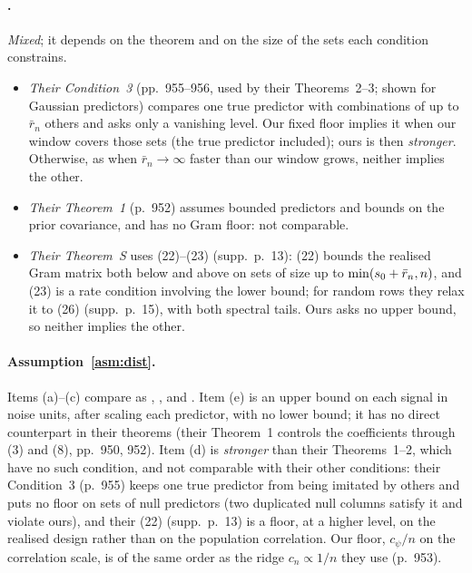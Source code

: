 \paragraph{.} \emph{Mixed}; it depends on the theorem and on the size of the sets each condition constrains.
\begin{itemize}[leftmargin=1.5em,itemsep=0pt,topsep=1pt]
  \item \emph{Their Condition~3} (pp.~955--956, used by their Theorems~2--3; shown for Gaussian predictors) compares one
    true predictor with combinations of up to $\bar r_n$ others and asks only a vanishing level. Our fixed floor implies it
    when our window covers those sets (the true predictor included); ours is then \emph{stronger}. Otherwise, as when
    $\bar r_n\to\infty$ faster than our window grows, neither implies the other.
  \item \emph{Their Theorem~1} (p.~952) assumes bounded predictors and bounds on the prior covariance, and has no Gram
    floor: not comparable.
  \item \emph{Their Theorem~S} uses (22)--(23) (supp.\ p.~13): (22) bounds the realised Gram matrix both below and above on
    sets of size up to $\min(s_0+\bar r_n,n)$, and (23) is a rate condition involving the lower bound; for random rows they
    relax it to (26) (supp.\ p.~15), with both spectral tails. Ours asks no upper bound, so neither implies the other.
\end{itemize}

\paragraph{Assumption~\ref{asm:dist}.} Items (a)--(c) compare as , ,  and . Item (e) is an
upper bound on each signal in noise units, after scaling each predictor, with no lower bound; it has no direct counterpart
in their theorems (their Theorem~1 controls the coefficients through (3) and (8), pp.~950, 952). Item (d) is
\emph{stronger} than their Theorems~1--2, which have no such condition, and not comparable with their other conditions:
their Condition~3 (p.~955) keeps one true predictor from being imitated by others and puts no floor on sets of null
predictors (two duplicated null columns satisfy it and violate ours), and their (22) (supp.\ p.~13) is a floor, at a higher
level, on the realised design rather than on the population correlation. Our floor, $c_\psi/n$ on the correlation scale, is of the same order as the ridge $c_n\propto1/n$ they use
(p.~953).

